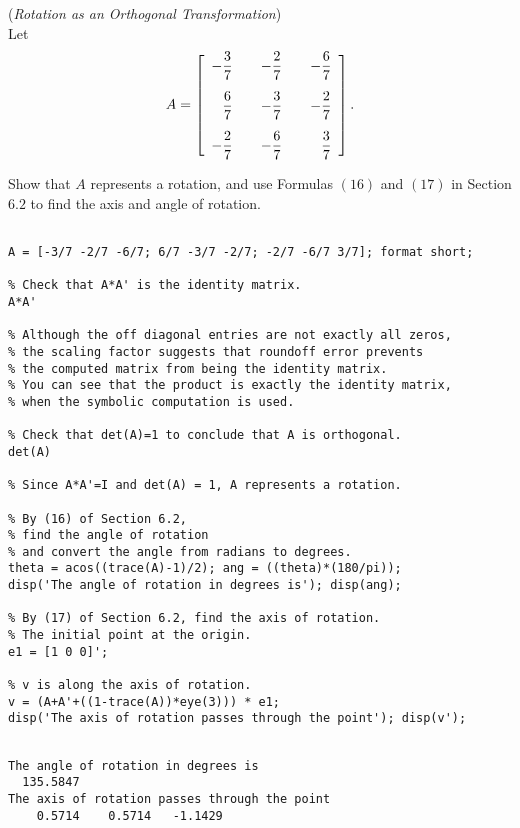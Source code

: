 \begin{exer} (\textit{Rotation as an Orthogonal Transformation})\\
Let
\begin{displaymath}
A = \left[\begin{array}{rrrr} \displaystyle -\frac{3}{7}&\quad \displaystyle -\frac{2}{7}&\quad \displaystyle -\frac{6}{7} \vspace{3mm} \\ \vspace{3mm} \displaystyle \frac{6}{7} & \displaystyle -\frac{3}{7} & \displaystyle -\frac{2}{7}\\ \displaystyle -\frac{2}{7} & \displaystyle -\frac{6}{7} & \displaystyle \frac{3}{7} \end{array} \right].
\end{displaymath}

\vspace{2mm}
\noindent Show that $A$ represents a rotation, and use Formulas $(16)$ and $(17)$ in Section $6.2$ to find the axis and angle of rotation.
\end{exer}

\begin{sol}
\begin{verbatim}

A = [-3/7 -2/7 -6/7; 6/7 -3/7 -2/7; -2/7 -6/7 3/7]; format short;

% Check that A*A' is the identity matrix.
A*A' 

% Although the off diagonal entries are not exactly all zeros,
% the scaling factor suggests that roundoff error prevents
% the computed matrix from being the identity matrix.
% You can see that the product is exactly the identity matrix,
% when the symbolic computation is used.

% Check that det(A)=1 to conclude that A is orthogonal.
det(A) 

% Since A*A'=I and det(A) = 1, A represents a rotation.

% By (16) of Section 6.2,
% find the angle of rotation 
% and convert the angle from radians to degrees.
theta = acos((trace(A)-1)/2); ang = ((theta)*(180/pi));
disp('The angle of rotation in degrees is'); disp(ang);

% By (17) of Section 6.2, find the axis of rotation.
% The initial point at the origin.
e1 = [1 0 0]'; 

% v is along the axis of rotation.
v = (A+A'+((1-trace(A))*eye(3))) * e1; 
disp('The axis of rotation passes through the point'); disp(v');
\end{verbatim}


\begin{outputs}

\begin{verbatim}

The angle of rotation in degrees is
  135.5847
The axis of rotation passes through the point
    0.5714    0.5714   -1.1429
\end{verbatim}
\end{outputs}
\end{sol}




